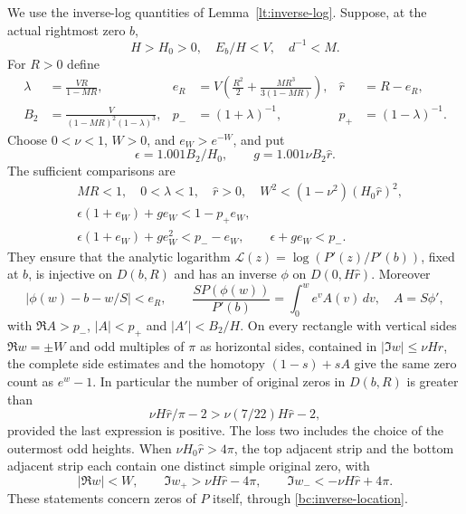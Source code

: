 We use the inverse-log quantities of Lemma~\ref{lt:inverse-log}.
Suppose, at the actual rightmost zero $b$,
\begin{equation}\label{bc:field-hypotheses}
 H>H_0>0,\quad E_b/H<V,\quad d^{-1}<M.
\end{equation}
For $R>0$ define
\begin{align}
 \lambda&=\frac{VR}{1-MR},&
 e_R&=V\left(\frac{R^2}2+\frac{MR^3}{3(1-MR)}\right),
 &\widehat r&=R-e_R,                                  \label{bc:inverse-def-1}\\
 B_2&=\frac{V}{(1-MR)^2(1-\lambda)^3},&
 p_-&=(1+\lambda)^{-1},&p_+&=(1-\lambda)^{-1}.
                                                               \label{bc:inverse-def-2}
\end{align}
Choose $0<\nu<1$, $W>0$, and $e_W>e^{-W}$, and put
\[
 \epsilon=1.001B_2/H_0,\qquad g=1.001\nu B_2\widehat r.
\]
The sufficient comparisons are
\begin{align}
 &MR<1,\quad 0<\lambda<1,\quad \widehat r>0,
       \quad W^2<(1-\nu^2)(H_0\widehat r)^2,
                                                    \label{bc:inverse-gates-1}\\
 &\epsilon(1+e_W)+ge_W<1-p_+e_W,
                                                    \label{bc:inverse-gates-2}\\
 &\epsilon(1+e_W)+ge_W^2<p_--e_W,
       \qquad \epsilon+ge_W<p_-.                   \label{bc:inverse-gates-3}
\end{align}
They ensure that the analytic logarithm
$\mathcal L(z)=\log(P'(z)/P'(b))$, fixed at $b$, is injective on
$D(b,R)$ and has an inverse $\phi$ on $D(0,H\widehat r)$.
Moreover
\begin{equation}\label{bc:inverse-location}
 |\phi(w)-b-w/S|<e_R,\qquad
 \frac{SP(\phi(w))}{P'(b)}=\int_0^we^v A(v)\,dv,\quad A=S\phi',
\end{equation}
with $\Re A>p_-$, $|A|<p_+$ and $|A'|<B_2/H$.
On every rectangle with vertical sides $\Re w=\pm W$ and odd
multiples of $\pi$ as horizontal sides, contained in
$|\Im w|\leq\nu H\widehat r$, the complete side estimates and
the homotopy $(1-s)+sA$ give the same zero count as $e^w-1$.
In particular the number of original zeros in $D(b,R)$ is greater than
\begin{equation}\label{bc:inverse-count}
 \nu H\widehat r/\pi-2>
 \nu(7/22)H\widehat r-2,
\end{equation}
provided the last expression is positive.  The loss two includes the
choice of the outermost odd heights.  When
$\nu H_0\widehat r>4\pi$, the top adjacent strip and the bottom
adjacent strip each contain one distinct simple original zero, with
\begin{equation}\label{bc:high-strips}
 |\Re w|<W,\qquad
 \Im w_+>\nu H\widehat r-4\pi,\qquad
 \Im w_-<-\nu H\widehat r+4\pi.
\end{equation}
These statements concern zeros of $P$ itself, through
\eqref{bc:inverse-location}.

